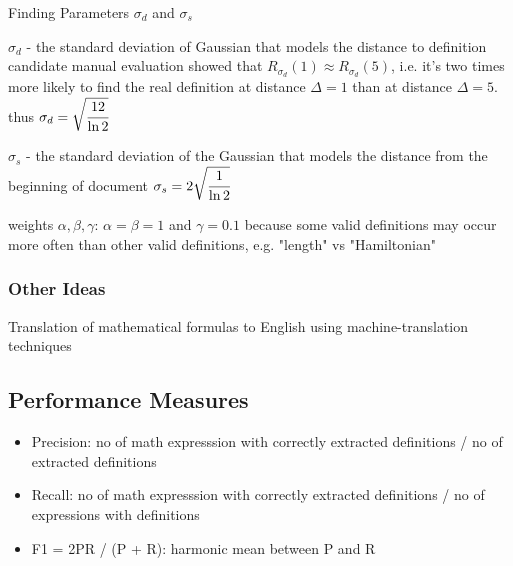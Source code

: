 Finding Parameters $\sigma_d$ and $\sigma_s$

$\sigma_d$ - the standard deviation of Gaussian that models the distance to definition candidate
manual evaluation showed that $R_{\sigma_d}(1) \approx R_{\sigma_d}(5)$,
i.e. it's two times more likely to find the real definition at distance $\Delta=1$ 
than at distance $\Delta=5$.
thus $\sigma_d = \sqrt{\cfrac{12}{\ln 2}}$


$\sigma_s$ - the standard deviation of the Gaussian that models the distance 
from the beginning of document
% 
$\sigma_s = 2 \sqrt{\cfrac{1}{\ln 2}}$


weights $\alpha, \beta, \gamma$:
$\alpha = \beta = 1$ and 
$\gamma = 0.1$ because some valid definitions may occur more often than other 
valid definitions, e.g. "length" vs "Hamiltonian"


\subsubsection{Other Ideas}
Translation of mathematical formulas to English using machine-translation techniques
\cite{nghiem2012towards}


\subsection{Performance Measures}

\begin{itemize}
  \item Precision: no of math expresssion with correctly extracted definitions / no of extracted definitions
  \item Recall: no of math expresssion with correctly extracted definitions / no of expressions with definitions
  \item F1 = 2PR / (P + R): harmonic mean between P and R
\end{itemize}
